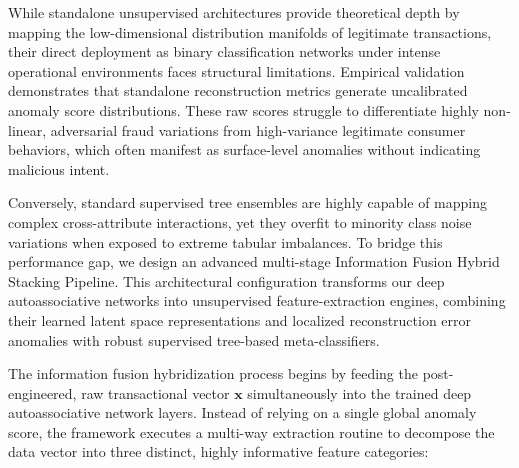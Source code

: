 While standalone unsupervised architectures provide theoretical depth by mapping the low-dimensional distribution manifolds of legitimate transactions, their direct deployment as binary classification networks under intense operational environments faces structural limitations. Empirical validation demonstrates that standalone reconstruction metrics generate uncalibrated anomaly score distributions. These raw scores struggle to differentiate highly non-linear, adversarial fraud variations from high-variance legitimate consumer behaviors, which often manifest as surface-level anomalies without indicating malicious intent.

Conversely, standard supervised tree ensembles are highly capable of mapping complex cross-attribute interactions, yet they overfit to minority class noise variations when exposed to extreme tabular imbalances. To bridge this performance gap, we design an advanced multi-stage Information Fusion Hybrid Stacking Pipeline. This architectural configuration transforms our deep autoassociative networks into unsupervised feature-extraction engines, combining their learned latent space representations and localized reconstruction error anomalies with robust supervised tree-based meta-classifiers.

The information fusion hybridization process begins by feeding the post-engineered, raw transactional vector $\mathbf{x}$ simultaneously into the trained deep autoassociative network layers. Instead of relying on a single global anomaly score, the framework executes a multi-way extraction routine to decompose the data vector into three distinct, highly informative feature categories:

